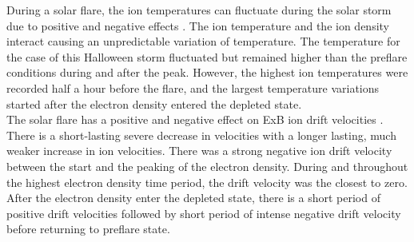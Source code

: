 During a solar flare, the ion temperatures can fluctuate during the solar storm due to positive and negative effects \cite{ITemp}. The ion temperature and the ion density interact causing an unpredictable variation of temperature. The temperature for the case of this Halloween storm fluctuated but remained higher than the preflare conditions during and after the peak. However, the highest ion temperatures were recorded half a hour before the flare, and the largest temperature variations started after the electron density entered the depleted state.  \\

The solar flare has a positive and negative effect on ExB ion drift velocities \cite{IDrift}. There is a short-lasting severe decrease in velocities with a longer lasting, much weaker increase in ion velocities. There was a strong negative ion drift velocity between the start and the peaking of the electron density. During and throughout the highest electron density time period, the drift velocity was the closest to zero. After the electron density enter the depleted state, there is a short period of positive drift velocities followed by short period of intense negative drift velocity before returning to preflare state.


